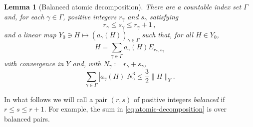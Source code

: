 \documentclass[10pt,a4paper]{amsart}
\newtheorem{lemma}[theorem]{Lemma}
\begin{document}
\begin{lemma}[Balanced atomic decomposition]\label{lem:balanced-decomp}
There are a countable index set $\Gamma$ and, for each $\gamma\in\Gamma$, positive integers $r_\gamma$ and $s_\gamma$ satisfying
\[
 r_\gamma\leq s_\gamma\leq r_\gamma+1 \,,
\]
and a linear map $Y_0\ni H\mapsto (a_\gamma(H))_{\gamma\in\Gamma}$ such that, for all $H\in Y_0$,
\begin{equation}\label{eq:atomic-decomposition}
 H=\sum_{\gamma\in\Gamma} a_\gamma(H)E_{r_\gamma,s_\gamma}
\end{equation}
with convergence in $Y$ and, with $N_\gamma:=r_\gamma+s_\gamma$, 
\begin{equation}\label{eq:atomic-bound}
 \sum_{\gamma\in\Gamma} |a_\gamma(H)|N_\gamma^3
 \leq\frac32\|H\|_Y.
\end{equation}
\end{lemma}

In what follows we will call a pair $(r,s)$ of positive integers \emph{balanced} if $r\leq s\leq r+1$. For example, the sum in \eqref{eq:atomic-decomposition} is over balanced pairs.
\end{document}
